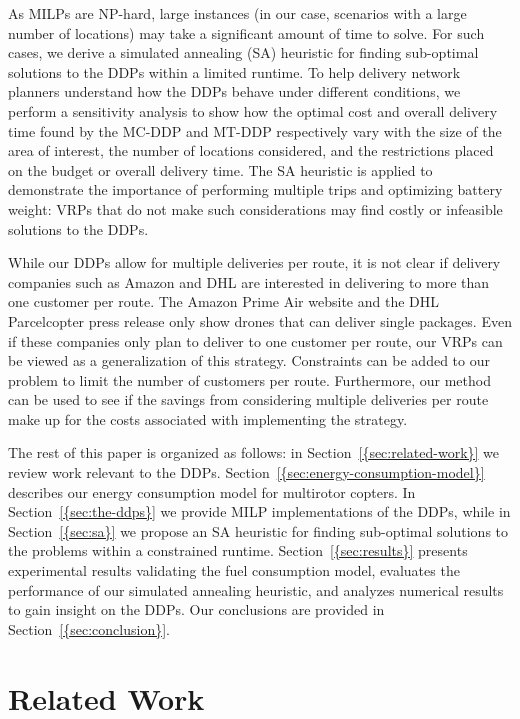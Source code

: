 \documentclass[journal]{IEEEtran}
\begin{document}
As MILPs are NP-hard, large instances (in our case, scenarios with a large number of locations) may take a significant amount of time to solve. For such cases, we derive a simulated annealing (SA) heuristic for finding sub-optimal solutions to the DDPs within a limited runtime. To help delivery network planners understand how the DDPs behave under different conditions, we perform a sensitivity analysis to show how the optimal cost and overall delivery time found by the MC-DDP and MT-DDP respectively vary with the size of the area of interest, the number of locations considered, and the restrictions placed on the budget or overall delivery time. The SA heuristic is applied to demonstrate the importance of performing multiple trips and optimizing battery weight: VRPs that do not make such considerations may find costly or infeasible solutions to the DDPs.

While our DDPs allow for multiple deliveries per route, it is not clear if delivery companies such as Amazon and DHL are interested in delivering to more than one customer per route. The Amazon Prime Air website \cite{primeair} and the DHL Parcelcopter press release \cite{parcelcopter} only show drones that can deliver single packages. Even if these companies only plan to deliver to one customer per route, our VRPs can be viewed as a generalization of this strategy. Constraints can be added to our problem to limit the number of customers per route. Furthermore, our method can be used to see if the savings from considering multiple deliveries per route make up for the costs associated with implementing the strategy.

The rest of this paper is organized as follows: in {Section~\ref{{sec:related-work}}} we review work relevant to the DDPs. {Section~\ref{{sec:energy-consumption-model}}} describes our energy consumption model for multirotor copters. In {Section~\ref{{sec:the-ddps}}} we provide MILP implementations of the DDPs, while in {Section~\ref{{sec:sa}}} we propose an SA heuristic for finding sub-optimal solutions to the problems within a constrained runtime. {Section~\ref{{sec:results}}} presents experimental results validating the fuel consumption model, evaluates the performance of our simulated annealing heuristic, and analyzes numerical results to gain insight on the DDPs. Our conclusions are provided in {Section~\ref{{sec:conclusion}}}.

\section{Related Work}
\label{sec:related-work}
\end{document}
